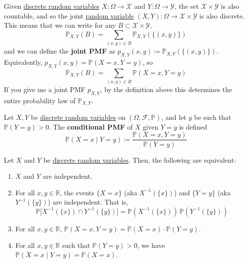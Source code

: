 	\begin{definition}
	  \label{def:joint-pmf}
		Given \hyperref[def:discrete-random-variable]{discrete random variables} $X: \Omega \to \mathcal{X}$ and $Y: \Omega \to \mathcal{Y}$, the set $\mathcal{X} \times \mathcal{Y}$ is also countable, and so the joint \hyperref[def:random-variable]{random variable} $(X, Y): \Omega \to \mathcal{X} \times \mathcal{Y}$ is also discrete. This means that we can write for any $B \subset \mathcal{X} \times \mathcal{Y}$, 
		\begin{equation}
			\mathbb{P}_{X, Y} (B) = \sum_{(x, y) \in B} \mathbb{P}_{X, Y} (\{(x, y)\})
		\end{equation}
		and we can define the \textbf{joint PMF} as $p_{X, Y} (x, y) \coloneqq \mathbb{P}_{X, Y} (\{(x, y)\})$. Equivalently, $p_{X, Y} (x, y) = \mathbb{P} (X = x, Y = y)$, so 
		\begin{equation}
			\mathbb{P}_{X, Y} (B) = \sum_{(x, y) \in B} \mathbb{P} (X = x, Y = y)
		\end{equation}
		If you give me a joint PMF $p_{X, Y}$, by the definition above this determines the entire probability law of $\mathbb{P}_{X, Y}$. 
	\end{definition} 

	\begin{definition}
	  \label{def:conditional-pmf}
		Let $X, Y$ be \hyperref[def:discrete-random-variable]{discrete random variables} on $(\Omega, \mathcal{F}, \mathbb{P})$, and let $y$ be such that $\mathbb{P}(Y = y) > 0$. The \textbf{conditional PMF} of $X$ given $Y = y$ is defined 
		\begin{equation}
			\mathbb{P}(X = x \mid Y = y) \coloneqq \frac{\mathbb{P}(X = x, Y = y)}{\mathbb{P}(Y = y)}
		\end{equation}
	\end{definition}

	\begin{theorem}
	  \label{thm:tfae}
		Let $X$ and $Y$ be \hyperref[def:discrete-random-variable]{discrete random variables}. Then, the following are equivalent: 
		\begin{enumerate}
			\item $X$ and $Y$ are independent. 
			\item For all $x, y \in \mathbb{R}$, the events $\{X = x\}$ (aka $X^{-1} (\{x\})$) and $\{Y = y\}$ (aka $Y^{-1} (\{y\})$) are independent. That is, 
			\begin{equation}
				\mathbb{P} \big[ X^{-1}(\{x\}) \cap Y^{-1}(\{y\}) \big] = \mathbb{P}(X^{-1}(\{x\})) \, \mathbb{P}(Y^{-1}(\{y\}))
			\end{equation}
			\item For all $x, y \in \mathbb{R}$, $\mathbb{P}(X = x, Y = y) = \mathbb{P}(X = x) \cdot \mathbb{P}(Y = y)$. 
			\item For all $x, y \in \mathbb{R}$ such that $\mathbb{P}(Y = y) > 0$, we have $\mathbb{P}(X = x \mid Y = y) = \mathbb{P}(X = x)$. 
		\end{enumerate}
	\end{theorem}

